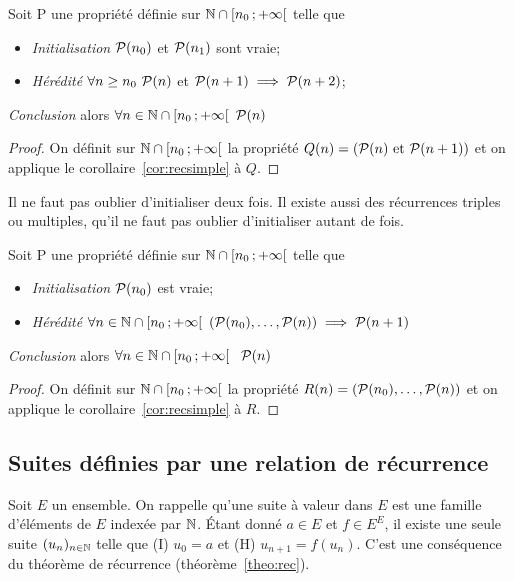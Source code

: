 \begin{cor}
  \label{cor:recdouble}
  Soit P une propriété définie sur $\N\cap \intervallefo{n_0}{+\infty}$ telle que
 \begin{itemize}
  \item \emph{Initialisation} $\P(n_0)$ et $\P(n_1)$ sont vraie;
  \item \emph{Hérédité} $\forall n\geq n_0 \ \P(n)$ et $\P(n+1) \implies \P(n+2)$;
  \end{itemize}
  \emph{Conclusion} alors $\forall n \in \N\cap \intervallefo{n_0}{+\infty} \ \P(n)$ 
\end{cor}
\begin{proof}
  On définit sur $\N\cap \intervallefo{n_0}{+\infty}$ la propriété $Q(n)=(\P(n) \text{ et } \P(n+1))$ et on applique le corollaire~\ref{cor:recsimple} à $Q$.
\end{proof}
Il ne faut pas oublier d'initialiser deux fois. Il existe aussi des récurrences triples ou multiples, qu'il ne faut pas oublier d'initialiser autant de fois.
\begin{cor}
  \label{cor:recforte}
  Soit P une propriété définie sur $\N\cap \intervallefo{n_0}{+\infty}$ telle que
  \begin{itemize}
  \item \emph{Initialisation} $\P(n_0)$ est vraie;
  \item \emph{Hérédité}  $\forall n \in \N\cap \intervallefo{n_0}{+\infty} \ (\P(n_0), \ldots, \P(n)) \implies \P(n+1)$
  \end{itemize}
  \emph{Conclusion} alors $\forall n \in \N\cap \intervallefo{n_0}{+\infty}\ \ \P(n)$
\end{cor}
\begin{proof}
  On définit sur $\N\cap \intervallefo{n_0}{+\infty}$ la propriété $R(n)=(\P(n_0), \ldots, \P(n))$ et on applique le corollaire~\ref{cor:recsimple} à $R$.
\end{proof}

\subsection{Suites définies par une relation de récurrence}

Soit $E$ un ensemble. On rappelle qu'une suite à valeur dans $E$ est une famille d'éléments de $E$ indexée par $\N$. Étant donné $a\in E$ et $f\in E^E$, il existe une seule suite $(u_n)_{n\in\N}$ telle que (I) $u_0=a$ et (H) $u_{n+1}=f(u_n)$. C'est une conséquence du théorème de récurrence (théorème~\ref{theo:rec}).

